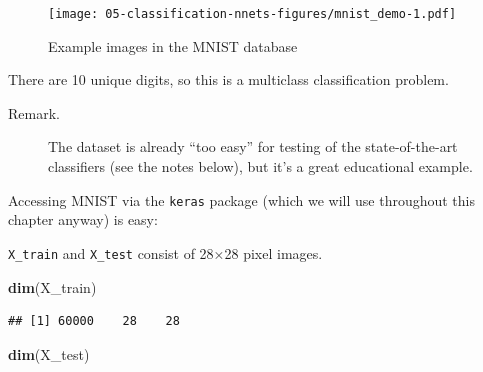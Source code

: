 \documentclass[10pt,b5paper,krantz1]{krantz}
\newenvironment{Shaded}{\begin{snugshade}}{\end{snugshade}}
\newcommand{\KeywordTok}[1]{\textcolor[rgb]{0.27,0.27,0.27}{\textbf{#1}}}
\newcommand{\NormalTok}[1]{#1}
\newcommand{\OperatorTok}[1]{\textcolor[rgb]{0.43,0.43,0.43}{\textbf{#1}}}
\newcommand{\StringTok}[1]{\textcolor[rgb]{0.5,0.5,0.5}{#1}}
\begin{document}
\begin{figure}
\hypertarget{fig:mnist_demo}{%
\centering
\texttt{[image: 05-classification-nnets-figures/mnist\_demo-1.pdf]}
\caption{Example images in the MNIST database}\label{fig:mnist_demo}
}
\end{figure}

There are 10 unique digits, so this is a multiclass classification problem.

\begin{description}
\item[Remark.]
The dataset is already ``too easy'' for testing of the state-of-the-art
classifiers (see the notes below), but it's a great educational example.
\end{description}

Accessing MNIST via the \texttt{keras} package
(which we will use throughout this chapter anyway) is easy:

\begin{Shaded}
\end{Shaded}

\texttt{X\_train} and \texttt{X\_test} consist of 28×28 pixel images.

\begin{Shaded}
\begin{Highlighting}[]
\KeywordTok{dim}\NormalTok{(X_train)}
\end{Highlighting}
\end{Shaded}

\begin{verbatim}
## [1] 60000    28    28
\end{verbatim}

\begin{Shaded}
\begin{Highlighting}[]
\KeywordTok{dim}\NormalTok{(X_test)}
\end{Highlighting}
\end{Shaded}
\end{document}
